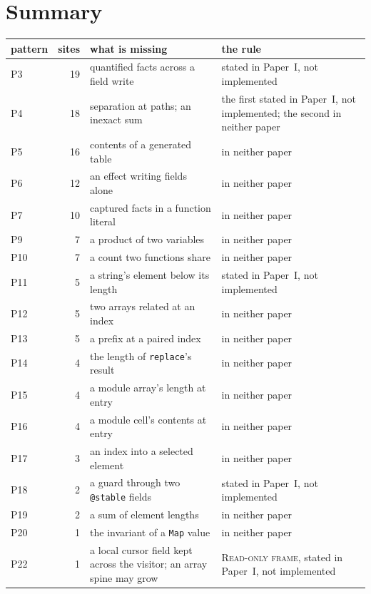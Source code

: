 \documentclass[10pt,a4paper]{article}
\theoremstyle{definition}
\theoremstyle{remark}
\newcommand{\code}[1]{\texttt{#1}}
\begin{document}
\section{Summary}

{\footnotesize
\begin{tabular}{@{}lrp{}p{}@{}}
\toprule
pattern & sites & what is missing & the rule\\
\midrule
P3 & 19 & quantified facts across a field write & stated in Paper~I, not implemented\\
P4 & 18 & separation at paths; an inexact sum & the first stated in Paper~I, not implemented; the second in neither paper\\
P5 & 16 & contents of a generated table & in neither paper\\
P6 & 12 & an effect writing fields alone & in neither paper\\
P7 & 10 & captured facts in a function literal & in neither paper\\
P9 & 7 & a product of two variables & in neither paper\\
P10 & 7 & a count two functions share & in neither paper\\
P11 & 5 & a string's element below its length & stated in Paper~I, not implemented\\
P12 & 5 & two arrays related at an index & in neither paper\\
P13 & 5 & a prefix at a paired index & in neither paper\\
P14 & 4 & the length of \code{replace}'s result & in neither paper\\
P15 & 4 & a module array's length at entry & in neither paper\\
P16 & 4 & a module cell's contents at entry & in neither paper\\
P17 & 3 & an index into a selected element & in neither paper\\
P18 & 2 & a guard through two \code{@stable} fields & stated in Paper~I, not implemented\\
P19 & 2 & a sum of element lengths & in neither paper\\
P20 & 1 & the invariant of a \code{Map} value & in neither paper\\
P22 & 1 & a local cursor field kept across the visitor; an array spine may grow & \textsc{Read-only frame}, stated in Paper~I, not implemented\\
\bottomrule
\end{tabular}}
\end{document}
